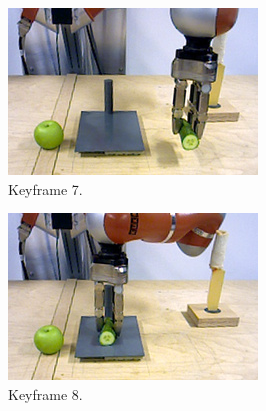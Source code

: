 \begin{figure}\ContinuedFloat
  \centering
  \begin{subfigure}[t]{0.475\textwidth}
    \includegraphics[width=\textwidth]{./figures/sec/planning/exec4/frame2502.jpg}
    \caption{Keyframe 7.}
    \label{fig:sec_usingaffordanceforplanning_results_scenario4_7}
  \end{subfigure}
  \hfill
  \begin{subfigure}[t]{0.475\textwidth}
    \includegraphics[width=\textwidth]{./figures/sec/planning/exec4/frame2872.jpg}
    \caption{Keyframe 8.}
    \label{fig:sec_usingaffordanceforplanning_results_scenario4_8}
  \end{subfigure}\\%
  \begin{subfigure}[t]{0.475\textwidth}

\end{subfigure}
\end{figure}
